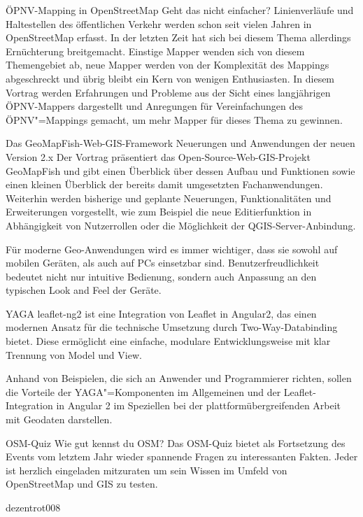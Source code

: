 %
{ÖPNV-Mapping in OpenStreetMap}%
{Geht das nicht einfacher?}%
{Linienverläufe und Haltestellen des öffentlichen Verkehr werden schon seit vielen Jahren in
OpenStreetMap erfasst. In der letzten Zeit hat sich bei diesem Thema allerdings Ernüchterung
breitgemacht. Einstige Mapper wenden sich von diesem Themengebiet ab, neue Mapper werden von der
Komplexität des Mappings abgeschreckt und übrig bleibt ein Kern von wenigen Enthusiasten.
In diesem
Vortrag werden Erfahrungen und Probleme aus der Sicht eines langjährigen ÖPNV-Mappers dargestellt
und Anregungen für Vereinfachungen des ÖPNV"=Mappings gemacht, um mehr Mapper für dieses Thema zu
gewinnen.}

\vspace{-1\baselineskip}


%
{Das GeoMapFish-Web-GIS-Framework}%
{Neuerungen und Anwendungen der neuen Version 2.x}%
{Der Vortrag präsentiert das Open-Source-Web-GIS-Projekt GeoMapFish und gibt einen Überblick über
dessen Aufbau und Funktionen sowie einen kleinen Überblick der bereits damit umgesetzten
Fachanwendungen. Weiterhin werden bisherige und geplante Neuerungen, Funktionalitäten und
Erweiterungen vorgestellt, wie zum Beispiel die neue Editierfunktion in Abhängigkeit von
Nutzerrollen oder die Möglichkeit der QGIS-Server-Anbindung.}

%
{}%
{Für moderne Geo-Anwendungen wird es immer wichtiger, dass sie sowohl auf
mobilen Geräten, als auch auf PCs einsetzbar sind. Benutzerfreudlichkeit
bedeutet nicht nur intuitive Bedienung, sondern auch Anpassung an den typischen
Look and Feel der Geräte.

YAGA leaflet-ng2 ist eine Integration von Leaflet in Angular2, das einen
modernen Ansatz für die technische Umsetzung durch Two-Way-Databinding
bietet. Diese ermöglicht eine einfache, modulare Entwicklungsweise mit klar
Trennung von Model und View.

Anhand von Beispielen, die sich an Anwender und Programmierer richten, sollen
die Vorteile der YAGA"=Komponenten im Allgemeinen und der Leaflet-Integration in
Angular 2 im Speziellen bei der plattformübergreifenden Arbeit mit Geodaten
darstellen.
}

\vspace{-0.5\baselineskip}
%
{OSM-Quiz}%
{Wie gut kennst du OSM?}%
{Das OSM-Quiz bietet als Fortsetzung des Events vom letztem Jahr wieder spannende Fragen zu
interessanten Fakten. Jeder ist herzlich eingeladen mitzuraten um sein Wissen im Umfeld von
OpenStreetMap und GIS zu testen.}

\vspace{-0.5\baselineskip}
\vspace{-2\baselineskip}
%
{dezentrot}{008}
